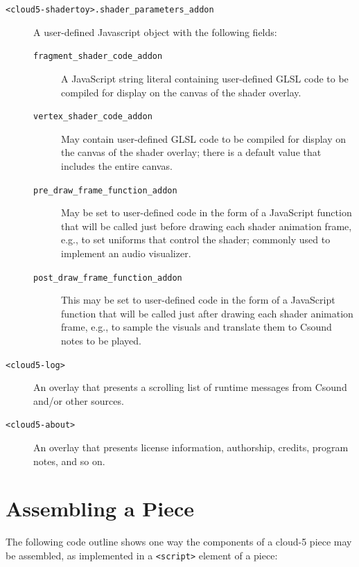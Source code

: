 \documentclass[runningheads,a4paper]{llncs}
\begin{document}
\begin{description}
\item[\texttt{<cloud5-shadertoy>.shader\_parameters\_addon}] A user-defined Javascript object with the following fields:
\begin{description}
\item[\texttt{fragment\_shader\_code\_addon}] A JavaScript string literal containing user-defined GLSL code to be compiled for display on the canvas of the shader overlay.
\item[\texttt{vertex\_shader\_code\_addon}] May contain user-defined GLSL code to be compiled for display on the canvas of the shader overlay; there is a default value that includes the entire canvas.
\item[\texttt{pre\_draw\_frame\_function\_addon}] May be set to user-defined code in the form of a JavaScript function that will be called just before drawing each shader animation frame, e.g., to set uniforms that control the shader; commonly used to implement an audio visualizer.
\item[\texttt{post\_draw\_frame\_function\_addon}] This may be set to user-defined code in the form of a JavaScript function that will be called just after drawing each shader animation frame, e.g., to sample the visuals and translate them to Csound notes to be played.
\end{description}
\item[\texttt{<cloud5-log>}] An overlay that presents a scrolling list of runtime messages from Csound and/or other sources.
\item[\texttt{<cloud5-about>}] An overlay that presents license information, authorship, credits, program notes, and so on.
\end{description}

\section{Assembling a Piece}

The following code outline shows one way the components of a cloud-5 piece may be assembled, as implemented in a \verb|<script>| element of a piece:
\end{document}
